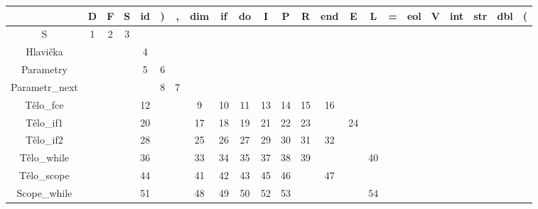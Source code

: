 \documentclass[11pt, a4paper]{article}
\begin{document}
			\begin{table}[h]
			\centering
			{\scriptsize {\renewcommand{\arraystretch}{1.2}
			\addtolength{\tabcolsep}{-1.1pt}
			\begin{tabular}{|c|c|c|c|c|c|c|c|c|c|c|c|c|c|c|c|c|c|c|c|c|c|c|}
				\hline
				& D & F & S & id & )  & ,  & dim & if & do & I & P & R & end & E & L & =  & eol & V & int & str & dbl & (  \\ \hline
				S                   & 1       & 2        & 3     &    &    &    &     &    &    &       &       &        &     &      &      &    &     &         &         &        &        &    \\ \hline
				Hlavička            &         &          &       & 4  &    &    &     &    &    &       &       &        &     &      &      &    &     &         &         &        &        &    \\ \hline
				Parametry           &         &          &       & 5  & 6  &    &     &    &    &       &       &        &     &      &      &    &     &         &         &        &        &    \\ \hline
				Parametr\_next      &         &          &       &    & 8  & 7  &     &    &    &       &       &        &     &      &      &    &     &         &         &        &        &    \\ \hline
				Tělo\_fce           &         &          &       & 12 &    &    & 9   & 10 & 11 & 13    & 14    & 15     & 16  &      &      &    &     &         &         &        &        &    \\ \hline
				Tělo\_if1           &         &          &       & 20 &    &    & 17  & 18 & 19 & 21    & 22    & 23     &     & 24   &      &    &     &         &         &        &        &    \\ \hline
				Tělo\_if2           &         &          &       & 28 &    &    & 25  & 26 & 27 & 29    & 30    & 31     & 32  &      &      &    &     &         &         &        &        &    \\ \hline
				Tělo\_while         &         &          &       & 36 &    &    & 33  & 34 & 35 & 37    & 38    & 39     &     &      & 40   &    &     &         &         &        &        &    \\ \hline
				Tělo\_scope         &         &          &       & 44 &    &    & 41  & 42 & 43 & 45    & 46    &        & 47  &      &      &    &     &         &         &        &        &    \\ \hline
				Scope\_while        &         &          &       & 51 &    &    & 48  & 49 & 50 & 52    & 53    &        &     &      & 54   &    &     &         &         &        &        &    \\ \hline

\end{tabular}}}
\end{table}
\end{document}

